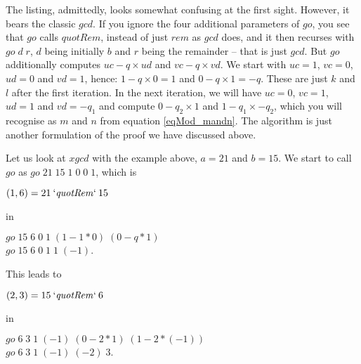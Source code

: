 \documentclass{scrreprt}
\newcommand{\Varid}[1]{\mathit{#1}}
\begin{document}
The listing, admittedly, looks somewhat confusing at the first sight.
However, it bears the classic \ensuremath{\Varid{gcd}}. If you ignore the
four additional parameters of \ensuremath{\Varid{go}},
you see that \ensuremath{\Varid{go}} calls \ensuremath{\Varid{quotRem}}, instead of just \ensuremath{\Varid{rem}}
as \ensuremath{\Varid{gcd}} does, and it then recurses with \ensuremath{\Varid{go}\;\Varid{d}\;\Varid{r}},
\ensuremath{\Varid{d}} being initially \ensuremath{\Varid{b}} and \ensuremath{\Varid{r}} being the remainder --
that is just \ensuremath{\Varid{gcd}}.
But \ensuremath{\Varid{go}} additionally computes $uc - q \times ud$ and $vc - q \times vd$.
We start with \ensuremath{\Varid{uc}\mathrel{=}\mathrm{1}}, \ensuremath{\Varid{vc}\mathrel{=}\mathrm{0}}, \ensuremath{\Varid{ud}\mathrel{=}\mathrm{0}} and \ensuremath{\Varid{vd}\mathrel{=}\mathrm{1}}, hence:
$1 - q \times 0 = 1$ and $0 - q \times 1 = -q$.
These are just $k$ and $l$ after the first iteration.
In the next iteration, we will have
$uc = 0$, $vc = 1$, $ud = 1$ and $vd = -q_1$ and compute
$0 - q_2 \times 1$ and $1 - q_1 \times -q_2$,
which you will recognise as $m$ and $n$ from
equation \ref{eqMod_mandn}.
The algorithm is just another formulation
of the proof we have discussed above.

Let us look at \ensuremath{\Varid{xgcd}} with the example above,
$a = 21$ and $b = 15$.
We start to call \ensuremath{\Varid{go}} as  
\ensuremath{\Varid{go}\;\mathrm{21}\;\mathrm{15}\;\mathrm{1}\;\mathrm{0}\;\mathrm{0}\;\mathrm{1}}, which is

\ensuremath{(\mathrm{1},\mathrm{6})\mathrel{=}\mathrm{21}\mathbin{`\Varid{quotRem}`}\mathrm{15}}

in

\ensuremath{\Varid{go}\;\mathrm{15}\;\mathrm{6}\;\mathrm{0}\;\mathrm{1}\;(\mathrm{1}\mathbin{-}\mathrm{1}\mathbin{*}\mathrm{0})\;(\mathrm{0}\mathbin{-}\Varid{q}\mathbin{*}\mathrm{1})}\\
\ensuremath{\Varid{go}\;\mathrm{15}\;\mathrm{6}\;\mathrm{0}\;\mathrm{1}\;\mathrm{1}\;(\mathbin{-}\mathrm{1})}.

This leads to

\ensuremath{(\mathrm{2},\mathrm{3})\mathrel{=}\mathrm{15}\mathbin{`\Varid{quotRem}`}\mathrm{6}}

in

\ensuremath{\Varid{go}\;\mathrm{6}\;\mathrm{3}\;\mathrm{1}\;(\mathbin{-}\mathrm{1})\;(\mathrm{0}\mathbin{-}\mathrm{2}\mathbin{*}\mathrm{1})\;(\mathrm{1}\mathbin{-}\mathrm{2}\mathbin{*}(\mathbin{-}\mathrm{1}))}\\
\ensuremath{\Varid{go}\;\mathrm{6}\;\mathrm{3}\;\mathrm{1}\;(\mathbin{-}\mathrm{1})\;(\mathbin{-}\mathrm{2})\;\mathrm{3}}.
\end{document}
